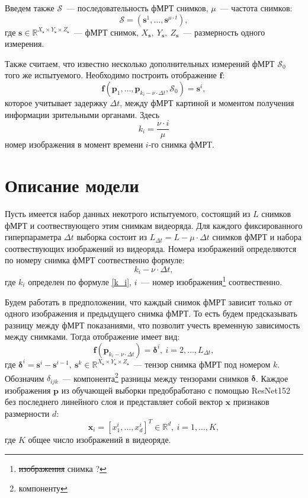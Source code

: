 \documentclass[12pt,twoside]{article}
\begin{document}
Введем также $\mathcal{S}$~--- последовательность фМРТ снимков,  $\mu$~--- частота снимков:
\begin{equation}
    \mathcal{S} = (\bm{s}^{1}, \dots, \bm{s}^{\mu \cdot t}),
\end{equation}
где $\bm{s} \in \mathbb{R}^{X_{\bm{s}} \times Y_{\bm{s}} \times Z_{\bm{s}}}$~--- фМРТ снимок, $X_{\bm{s}},~Y_{\bm{s}},~Z_{\bm{s}}$~--- размерность одного измерения.

Также считаем, что известно несколько дополнительных измерений фМРТ $\mathcal{S}_0$ того же испытуемого.
Необходимо построить отображение $\bm{f}$:
\begin{equation}
    \bm{f}(\bm{p}_{1}, \dots, \bm{p}_{k_i - \nu \cdot \Delta t}, \mathcal{S}_0) = \bm{s}^i,
\end{equation}
которое учитывает задержку $\Delta t$, между фМРТ картиной и моментом получения информации зрительными органами.
Здесь
\begin{equation}
    \label{k_i}
    k_i = \dfrac{\nu \cdot i}{\mu}
\end{equation}
номер изображения в момент времени $i$-го снимка фМРТ.

\section{Описание модели}
Пусть имеется набор данных некотрого испытуемого, состоящий из $L$ снимков фМРТ и соотвествующего этим снимкам видеоряда.
Для каждого фиксированного гиперпараметра $\Delta t$ выборка состоит из $L_{\Delta t} = L - \mu \cdot \Delta t$  снимков фМРТ и набора соотвествующих изображений из видеоряда. 
Номера изображений определяются по номеру снимка фМРТ соотвественно формуле:
\begin{equation}
    k_i - \nu \cdot \Delta t,
\end{equation}
где $k_i$ определен по формуле \eqref{k_i}, $i$~--- номер изображения\footnote{\sout{изображения} снимка ?} соотвественно.

Будем работать в предположении, что каждый снимок фМРТ зависит только от одного изображения и предыдущего снимка фМРТ. 
То есть будем предсказывать разницу между фМРТ показаниями, что позволит учесть временную зависимость между снимками.
Тогда отображение имеет вид:
\begin{equation}
	\label{main_model}
	\bm{f}(\bm{p}_{k_i - \nu \cdot \Delta t}) = \bm{\delta}^i, \ i = 2, \ldots, L_{\Delta t},
\end{equation}
где $\bm{\delta}^i = \bm{s}^i - \bm{s}^{i-1},~\bm{s}^k \in \mathbb{R}^{X_{\bm{s}} \times Y_{\bm{s}} \times Z_{\bm{s}}}$~--- тензор снимка фМРТ под номером $k$.
Обозначим $\delta_{ijk}$~--- компонента\footnote{компоненту} разницы между тензорами снимков $\bm{\delta}$.
Каждое изображения $\bm{p}$ из обучающей выборки предобработано с помощью ResNet152 без последнего линейного слоя и представляет собой вектор $\bm{x}$ признаков размерности $d$:
\[ \bm{x}_i = [x^i_1, \ldots, x^i_{d}]^{T} \in \mathbb{R}^{d}, \ i = 1, \ldots, K, \]
где $K$ общее число изображений в видеоряде.
\end{document}
